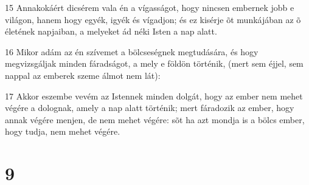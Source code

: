 \par 15 Annakokáért dicsérem vala én a vígasságot, hogy nincsen embernek jobb e világon, hanem hogy egyék, igyék és vígadjon; és ez kisérje õt munkájában az õ életének napjaiban, a melyeket ád néki Isten a nap alatt.
\par 16 Mikor adám az én szívemet a bölcseségnek megtudására, és hogy megvizsgáljak minden fáradságot, a mely e földön történik, (mert sem éjjel, sem nappal az emberek szeme álmot nem lát):
\par 17 Akkor eszembe vevém az Istennek minden dolgát, hogy az ember nem mehet végére a dolognak, amely a nap alatt történik; mert fáradozik az ember, hogy annak végére menjen, de nem mehet végére: sõt ha azt mondja is a bölcs ember, hogy tudja, nem mehet végére.

\chapter{9}

